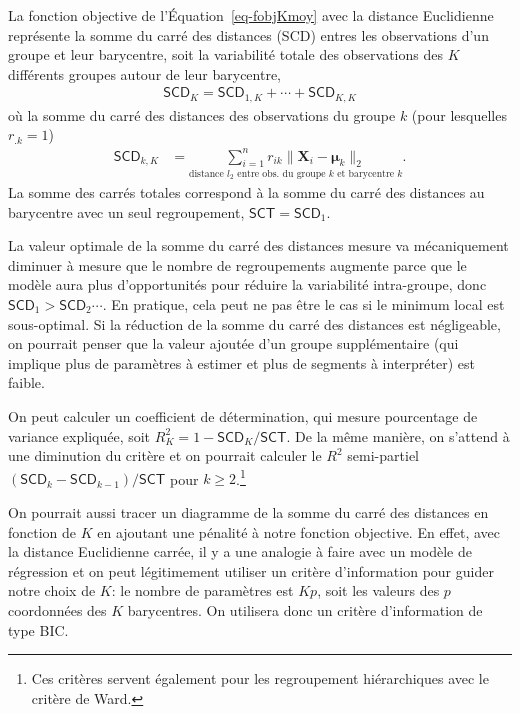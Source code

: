 \documentclass[
  11pt,
  letterpaper,
]{scrbook}
\theoremstyle{definition}
\theoremstyle{remark}
\begin{document}
La fonction objective de l'Équation~\ref{eq-fobjKmoy} avec la distance
Euclidienne représente la somme du carré des distances (SCD) entres les
observations d'un groupe et leur barycentre, soit la variabilité totale
des observations des \(K\) différents groupes autour de leur barycentre,
\begin{align*}
\mathsf{SCD}_K = \mathsf{SCD}_{1,K} + \cdots + \mathsf{SCD}_{K,K}
\end{align*} où la somme du carré des distances des observations du
groupe \(k\) (pour lesquelles \(r_{.k}=1\)) \begin{align*}
\mathsf{SCD}_{k,K} &= \underset{\mbox{distance $l_2$ entre obs. du groupe $k$ et barycentre $k$}}{\sum_{i=1}^n r_{ik}\|\mathbf{X}_i -  \boldsymbol{\mu}_{k}\|_2}.
\end{align*} La somme des carrés totales correspond à la somme du carré
des distances au barycentre avec un seul regroupement,
\(\mathsf{SCT} = \mathsf{SCD}_{1}\).

La valeur optimale de la somme du carré des distances mesure va
mécaniquement diminuer à mesure que le nombre de regroupements augmente
parce que le modèle aura plus d'opportunités pour réduire la variabilité
intra-groupe, donc \(\mathsf{SCD}_1 > \mathsf{SCD}_2 \cdots\). En
pratique, cela peut ne pas être le cas si le minimum local est
sous-optimal. Si la réduction de la somme du carré des distances est
négligeable, on pourrait penser que la valeur ajoutée d'un groupe
supplémentaire (qui implique plus de paramètres à estimer et plus de
segments à interpréter) est faible.

On peut calculer un coefficient de détermination, qui mesure pourcentage
de variance expliquée, soit \(R^2_K = 1-\mathsf{SCD}_K/\mathsf{SCT}\).
De la même manière, on s'attend à une diminution du critère et on
pourrait calculer le \(R^2\) semi-partiel
\((\mathsf{SCD}_{k} - \mathsf{SCD}_{k-1})/\mathsf{SCT}\) pour
\(k \geq 2\).\footnote{Ces critères servent également pour les
  regroupement hiérarchiques avec le critère de Ward.}

On pourrait aussi tracer un diagramme de la somme du carré des distances
en fonction de \(K\) en ajoutant une pénalité à notre fonction
objective. En effet, avec la distance Euclidienne carrée, il y a une
analogie à faire avec un modèle de régression et on peut légitimement
utiliser un critère d'information pour guider notre choix de \(K\): le
nombre de paramètres est \(Kp\), soit les valeurs des \(p\) coordonnées
des \(K\) barycentres. On utilisera donc un critère d'information de
type BIC.
\end{document}
